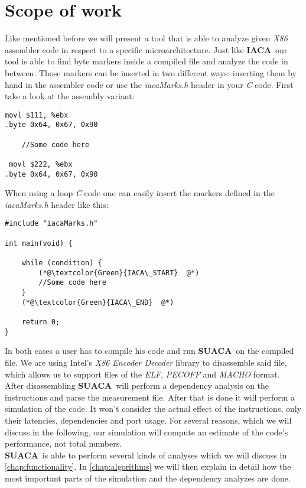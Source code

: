 \documentclass[a4paper,12pt,titlepage, twoside]{report}
\newcommand{\suaca}{\textbf{SUACA}}
\newcommand{\iaca}{\textbf{IACA}}
\begin{document}
\newpage
\section{Scope of work}

Like mentioned before we will present a tool that is able to analyze given \emph{X86} assembler code in respect to a specific microarchitecture. Just like \iaca\ our tool is able to find byte markers inside a compiled file and analyze the code in between. Those markers can be inserted in two different ways: inserting them by hand in the assembler code or use the \emph{iacaMarks.h} header in your \emph{C} code. First take a look at the assembly variant:

\begin{mdframed}[backgroundcolor=light-gray, roundcorner=10pt,leftmargin=1, rightmargin=1, innerleftmargin=15, innertopmargin=1,innerbottommargin=1, outerlinewidth=1, linecolor=light-gray]
\begin{lstlisting}[language={myLang}]
 movl $111, %ebx
.byte 0x64, 0x67, 0x90

    //Some code here
    
 movl $222, %ebx
.byte 0x64, 0x67, 0x90
\end{lstlisting}
\end{mdframed}

When using a loop \emph{C} code one can easily insert the markers defined in the \emph{iacaMarks.h} header like this:

\begin{mdframed}[backgroundcolor=light-gray, roundcorner=10pt,leftmargin=1, rightmargin=1, innerleftmargin=15, innertopmargin=1,innerbottommargin=1, outerlinewidth=1, linecolor=light-gray]
\begin{lstlisting}
#include "iacaMarks.h"

int main(void) {

    while (condition) {
        (*@\textcolor{Green}{IACA\_START}  @*)
        //Some code here
    }
    (*@\textcolor{Green}{IACA\_END}  @*)

    return 0;
}
\end{lstlisting}
\end{mdframed}

In both cases a user has to compile his code and run \suaca\ on the compiled file. We are using Intel's \emph{X86 Encoder Decoder
} library \cite{xed} to disassemble said file, which allows us to support files of the \emph{ELF}, \emph{PECOFF} and \emph{MACHO} format.\\
After disassembling \suaca\ will perform a dependency analysis on the instructions and parse the measurement file. After that is done it will perform a simulation of the code. It won't consider the actual effect of the instructions, only their latencies, dependencies and port usage. For several reasons, which we will discuss in the following, our simulation will compute an estimate of the code's performance, not total numbers.\\
\suaca\ is able to perform several kinds of analyses which we will discuss in \autoref{chap:functionality}. In \autoref{chap:algorithms} we will then explain in detail how the most important parts of the simulation and the dependency analyzes are done.
\end{document}
